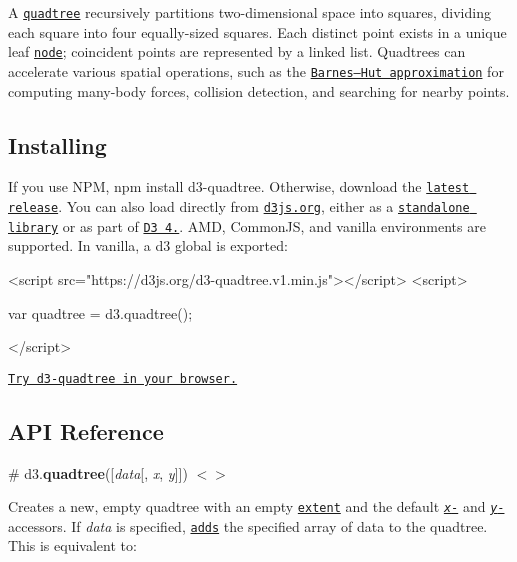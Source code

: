 A \href{https://en.wikipedia.org/wiki/Quadtree}{\tt quadtree} recursively partitions two-\/dimensional space into squares, dividing each square into four equally-\/sized squares. Each distinct point exists in a unique leaf \href{#nodes}{\tt node}; coincident points are represented by a linked list. Quadtrees can accelerate various spatial operations, such as the \href{https://en.wikipedia.org/wiki/Barnes–Hut_simulation}{\tt Barnes–\+Hut approximation} for computing many-\/body forces, collision detection, and searching for nearby points.

\href{http://bl.ocks.org/mbostock/9078690}{\tt } \href{http://bl.ocks.org/mbostock/4343214}{\tt }

\subsection*{Installing}

If you use N\+PM, {\ttfamily npm install d3-\/quadtree}. Otherwise, download the \href{https://github.com/d3/d3-quadtree/releases/latest}{\tt latest release}. You can also load directly from \href{https://d3js.org}{\tt d3js.\+org}, either as a \href{https://d3js.org/d3-quadtree.v1.min.js}{\tt standalone library} or as part of \href{https://github.com/d3/d3}{\tt D3 4.}. A\+MD, Common\+JS, and vanilla environments are supported. In vanilla, a {\ttfamily d3} global is exported\+:


\begin{DoxyCode}
<script src="https://d3js.org/d3-quadtree.v1.min.js"></script>
<script>

var quadtree = d3.quadtree();

</script>
\end{DoxyCode}


\href{https://tonicdev.com/npm/d3-quadtree}{\tt Try d3-\/quadtree in your browser.}

\subsection*{A\+PI Reference}

\label{_quadtree}%
\# d3.{\bfseries quadtree}(\mbox{[}{\itshape data}\mbox{[}, {\itshape x}, {\itshape y}\mbox{]}\mbox{]}) \href{https://github.com/d3/d3-quadtree/blob/master/src/quadtree.js#L14}{\tt $<$$>$}

Creates a new, empty quadtree with an empty \href{#quadtree_extent}{\tt extent} and the default \href{#quadtree_x}{\tt {\itshape x}-\/} and \href{#quadtree_y}{\tt {\itshape y}-\/}accessors. If {\itshape data} is specified, \href{#quadtree_addAll}{\tt adds} the specified array of data to the quadtree. This is equivalent to\+:


